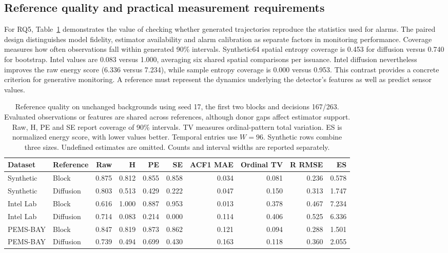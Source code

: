 \documentclass[conference]{IEEEtran}
\begin{document}
\subsection{Reference quality and practical measurement requirements}
For RQ5, Table~\ref{tab:fidelity} demonstrates the value of checking whether
generated trajectories reproduce the statistics used for alarms.
The paired design distinguishes model fidelity, estimator availability and
alarm calibration as separate factors in monitoring performance.
Coverage measures how often observations fall within generated 90\% intervals.
Synthetic64 spatial entropy coverage is 0.453 for diffusion versus 0.740
for bootstrap. Intel values are 0.083 versus 1.000, averaging six shared
spatial comparisons per issuance. Intel diffusion nevertheless improves the
raw energy score (6.336 versus 7.234), while sample entropy coverage is
0.000 versus 0.953. This contrast provides a concrete criterion for generative
monitoring. A reference must represent the dynamics underlying the detector's
features as well as predict sensor values.

\begin{table}[t]
\centering\small
\caption{Reference quality on unchanged backgrounds using seed 17, the
first two blocks and decisions 167/263. Evaluated observations or features
are shared across references, although donor gaps affect estimator support.
Raw, H, PE and SE report coverage of 90\% intervals. TV measures ordinal-pattern
total variation. ES is normalized energy score, with lower values better.
Temporal entries use $W=96$. Synthetic rows combine three sizes.
Undefined estimates are omitted. Counts and interval widths are reported separately.}
\label{tab:fidelity}
\begin{tabular}{llrrrrrrrr}\toprule
Dataset&Reference&Raw&H&PE&SE&ACF1 MAE&Ordinal TV&R RMSE&ES\\\midrule
Synthetic & Block & 0.875 & 0.812 & 0.855 & 0.858 & 0.034 & 0.081 & 0.236 & 0.578 \\
Synthetic & Diffusion & 0.803 & 0.513 & 0.429 & 0.222 & 0.047 & 0.150 & 0.313 & 1.747 \\
Intel Lab & Block & 0.616 & 1.000 & 0.887 & 0.953 & 0.013 & 0.378 & 0.467 & 7.234 \\
Intel Lab & Diffusion & 0.714 & 0.083 & 0.214 & 0.000 & 0.114 & 0.406 & 0.525 & 6.336 \\
PEMS-BAY & Block & 0.847 & 0.819 & 0.873 & 0.862 & 0.121 & 0.094 & 0.288 & 1.501 \\
PEMS-BAY & Diffusion & 0.739 & 0.494 & 0.699 & 0.430 & 0.163 & 0.118 & 0.360 & 2.055 \\
\bottomrule
\end{tabular}
\end{table}
\end{document}

